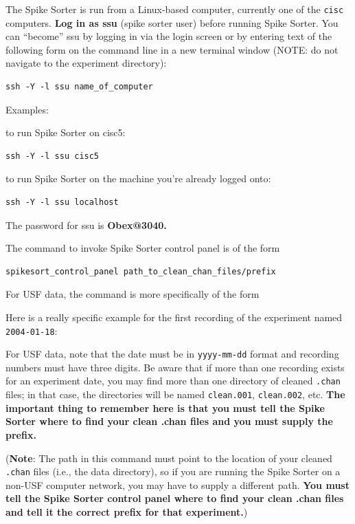 \documentclass[12pt]{article}
\begin{document}
The Spike Sorter is run from a Linux-based computer, currently one of
the {\tt cisc} computers. \textbf{Log in as \ttfamily ssu} (spike
sorter user) before running Spike Sorter. You can ``become'' ssu by
logging in via the login screen or by entering text of the following
form on the command line in a new terminal window (NOTE: do not
navigate to the experiment directory):
\begin{verbatim}
ssh -Y -l ssu name_of_computer
\end{verbatim}
Examples:

to run Spike Sorter on cisc5:
\begin{verbatim}
ssh -Y -l ssu cisc5
\end{verbatim}
to run Spike Sorter on the machine you're already logged onto:
\begin{verbatim}
ssh -Y -l ssu localhost
\end{verbatim}

The password for ssu is \textbf{\ttfamily Obex@3040.}

The command to invoke Spike Sorter control panel is of the form
\begin{verbatim}
spikesort_control_panel path_to_clean_chan_files/prefix
\end{verbatim}

For USF data, the command is more specifically of the form


Here is a really specific example for the first recording of
the experiment named {\tt 2004-01-18}:


For USF data, note that the date must be in {\tt yyyy-mm-dd} format
and recording numbers must have three digits. Be aware that if more
than one recording exists for an experiment date, you may find more
than one directory of cleaned {\tt .chan} files; in that case, the
directories will be named {\tt clean.001}, {\tt clean.002},
etc. {\bfseries The important thing to remember here is that you must
  tell the Spike Sorter where to find your clean {\ttfamily .chan}
  files and you must supply the prefix.}

(\textbf{Note}: The path in this command must point to the location of
your cleaned {\tt .chan} files (i.e., the data directory), so if you are
running the Spike Sorter on a non-USF computer network, you may have
to supply a different path. {\bfseries You must tell the Spike Sorter
  control panel where to find your clean {\ttfamily .chan} files and
  tell it the correct prefix for that experiment.})
\end{document}
